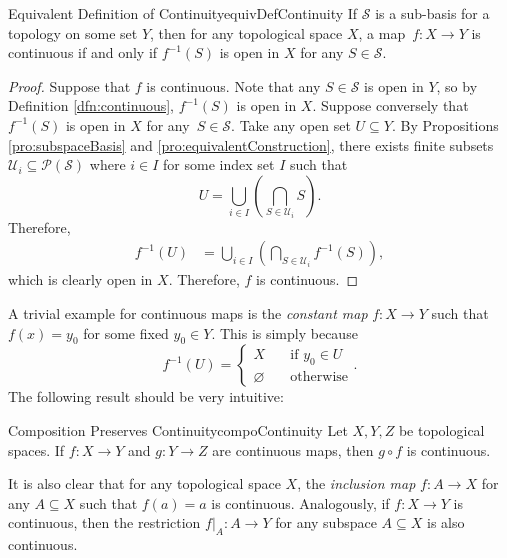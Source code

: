 \documentclass[math]{amznotes}
\theoremstyle{remark}
\begin{document}
\begin{probox}{Equivalent Definition of Continuity}{equivDefContinuity}
    If $\mathcal{S}$ is a sub-basis for a topology on some set $Y$, then for any topological space $X$, a map~$f \colon X \to Y$ is continuous if and only if $f^{-1}\left(S\right)$ is open in $X$ for any $S \in \mathcal{S}$.
    \tcblower
    \begin{proof}
        Suppose that $f$ is continuous. Note that any $S \in \mathcal{S}$ is open in $Y$, so by Definition \ref{dfn:continuous}, $f^{-1}\left(S\right)$ is open in $X$. Suppose conversely that $f^{-1}\left(S\right)$ is open in $X$ for any~$S \in \mathcal{S}$. Take any open set $U \subseteq Y$. By Propositions \ref{pro:subspaceBasis} and \ref{pro:equivalentConstruction}, there exists finite subsets $\mathcal{U}_i \subseteq \mathcal{P}\left(\mathcal{S}\right)$ where $i \in I$ for some index set $I$ such that 
        \begin{equation*}
            U = \bigcup_{i \in I}\left(\bigcap_{S \in \mathcal{U}_i}S\right).
        \end{equation*}
        Therefore,
        \begin{align*}
            f^{-1}\left(U\right) & = \bigcup_{i \in I}\left(\bigcap_{S \in \mathcal{U}_i}f^{-1}\left(S\right)\right),
        \end{align*}
        which is clearly open in $X$. Therefore, $f$ is continuous.
    \end{proof}
\end{probox}
A trivial example for continuous maps is the \textit{constant map} $f \colon X \to Y$ such that $f\left(x\right) = y_0$ for some fixed $y_0 \in Y$. This is simply because 
\begin{equation*}
    f^{-1}\left(U\right) = \begin{cases}
        X & \quad\textrm{if } y_0 \in U \\
        \varnothing & \quad\textrm{otherwise}
    \end{cases}.
\end{equation*}
The following result should be very intuitive:
\begin{probox}{Composition Preserves Continuity}{compoContinuity}
    Let $X, Y, Z$ be topological spaces. If $f \colon X \to Y$ and $g \colon Y \to Z$ are continuous maps, then $g \circ f$ is continuous.
\end{probox}
It is also clear that for any topological space $X$, the \textit{inclusion map} $f \colon A \to X$ for any $A \subseteq X$ such that $f\left(a\right) = a$ is continuous. Analogously, if $f \colon X \to Y$ is continuous, then the restriction $f\rvert_A \colon A \to Y$ for any subspace $A \subseteq X$ is also continuous.
\end{document}
